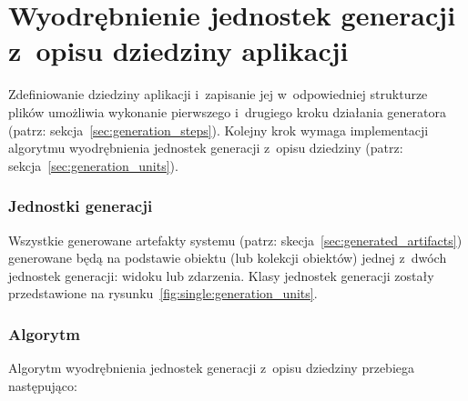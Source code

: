 \section{Wyodrębnienie jednostek generacji z~opisu dziedziny aplikacji} \label{sec:gen_units_extraction}

Zdefiniowanie dziedziny aplikacji i~zapisanie jej w~odpowiedniej strukturze plików umożliwia wykonanie pierwszego i~drugiego kroku działania generatora (patrz: sekcja~\ref{sec:generation_steps}).
Kolejny krok wymaga implementacji algorytmu wyodrębnienia jednostek generacji z~opisu dziedziny (patrz: sekcja~\ref{sec:generation_units}).

\subsubsection{Jednostki generacji}

Wszystkie generowane artefakty systemu (patrz: skecja~\ref{sec:generated_artifacts}) generowane będą na podstawie obiektu (lub kolekcji obiektów) jednej z~dwóch jednostek generacji: widoku lub zdarzenia.
Klasy jednostek generacji zostały przedstawione na rysunku~\ref{fig:single:generation_units}.



\subsubsection{Algorytm}

Algorytm wyodrębnienia jednostek generacji z~opisu dziedziny przebiega następująco:

